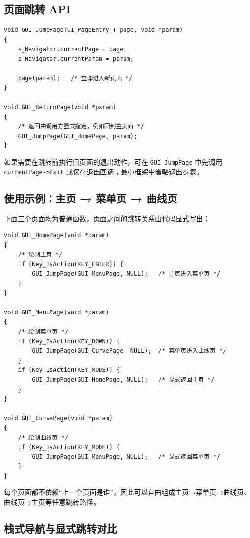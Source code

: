 \subsection{页面跳转 API}

\begin{lstlisting}[style=c]
void GUI_JumpPage(UI_PageEntry_T page, void *param)
{
    s_Navigator.currentPage = page;
    s_Navigator.currentParam = param;

    page(param);   /* 立即进入新页面 */
}

void GUI_ReturnPage(void *param)
{
    /* 返回由调用方显式指定，例如回到主页面 */
    GUI_JumpPage(GUI_HomePage, param);
}
\end{lstlisting}

如果需要在跳转前执行旧页面的退出动作，可在 \texttt{GUI\_JumpPage} 中先调用 \texttt{currentPage->Exit} 或保存退出回调；最小框架中省略退出步骤。

\subsection{使用示例：主页 → 菜单页 → 曲线页}

下面三个页面均为普通函数，页面之间的跳转关系由代码显式写出：

\begin{lstlisting}[style=c]
void GUI_HomePage(void *param)
{
    /* 绘制主页 */
    if (Key_IsAction(KEY_ENTER)) {
        GUI_JumpPage(GUI_MenuPage, NULL);   /* 主页进入菜单页 */
    }
}

void GUI_MenuPage(void *param)
{
    /* 绘制菜单页 */
    if (Key_IsAction(KEY_DOWN)) {
        GUI_JumpPage(GUI_CurvePage, NULL);  /* 菜单页进入曲线页 */
    }
    if (Key_IsAction(KEY_MODE)) {
        GUI_JumpPage(GUI_HomePage, NULL);   /* 显式返回主页 */
    }
}

void GUI_CurvePage(void *param)
{
    /* 绘制曲线页 */
    if (Key_IsAction(KEY_MODE)) {
        GUI_JumpPage(GUI_MenuPage, NULL);   /* 显式返回菜单页 */
    }
}
\end{lstlisting}

每个页面都不依赖“上一个页面是谁”，因此可以自由组成主页→菜单页→曲线页、曲线页→主页等任意跳转路径。

\subsection{栈式导航与显式跳转对比}

